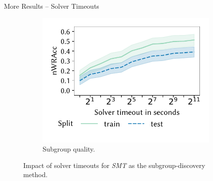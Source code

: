 \documentclass[en, navbaroff]{sdqbeamer}
\begin{document}
\begin{frame}[t]{More Results -- Solver Timeouts}
\begin{figure}
\begin{subfigure}[t]{0.4\textwidth}
			\includegraphics[width=\textwidth, trim=10 25 10 10, clip]{plots/csd-timeouts-nwracc.pdf}
			\caption{
				Subgroup quality.
			}
			\label{fig:csd:timeouts-nwracc}
		\end{subfigure}
		\caption*{
			Impact of solver timeouts for \emph{SMT} as the subgroup-discovery method.
		}
		\label{fig:csd:timeouts}
	\end{figure}
\end{frame}
\end{document}
